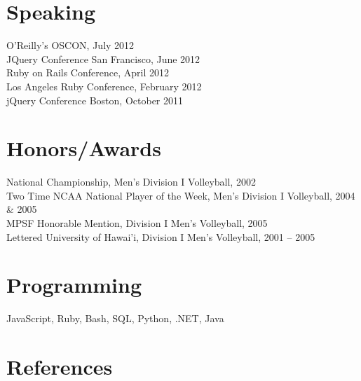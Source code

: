 \documentclass[margin,line]{resume}
\begin{document}
\begin{resume}
  \section{\mysidestyle Speaking}
  O'Reilly's OSCON, July 2012\vspace{1mm}\\
  JQuery Conference San Francisco, June 2012\vspace{1mm}\\
  Ruby on Rails Conference, April 2012\vspace{1mm}\\
  Los Angeles Ruby Conference, February 2012\vspace{1mm}\\
  jQuery Conference Boston, October 2011\vspace{1mm}\\

  \section{\mysidestyle Honors/Awards}
  National Championship, Men's Division I Volleyball, 2002\vspace{1mm}\\
  Two Time NCAA National Player of the Week, Men's Division I Volleyball, 2004 \& 2005\vspace{1mm}\\
  MPSF Honorable Mention, Division I Men's Volleyball, 2005\vspace{1mm}\\
  Lettered University of Hawai'i, Division I Men's Volleyball, 2001 -- 2005 \vspace{1mm}\\

  \section{\mysidestyle Programming}

  JavaScript, Ruby, Bash, SQL, Python, .NET, Java


  \section{\mysidestyle References}


\end{resume}
\end{document}
